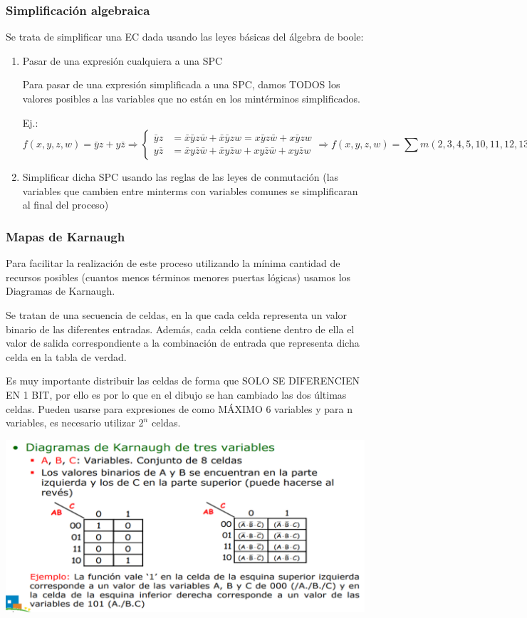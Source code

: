 \documentclass[a4paper,10pt]{book}
\begin{document}
\subsubsection*{Simplificación algebraica}
Se trata de simplificar una EC dada usando las leyes básicas del álgebra de boole:
\begin{enumerate}
\item Pasar de una expresión cualquiera a una SPC

Para pasar de una expresión simplificada a una SPC, damos TODOS los valores posibles a las variables que no están en los mintérminos simplificados.\par
Ej.:
$$f(x,y,z,w)=\bar{y}z+y\bar{z}\Rightarrow
\begin{cases}
\bar{y}z & =\bar{x}\bar{y}z\bar{w}+ \bar{x}\bar{y}zw=x\bar{y}z\bar{w}+x\bar{y}zw \\
y\bar{z} & =\bar{x}y\bar{z}\bar{w}+ \bar{x}y\bar{z}w + xy\bar{z}\bar{w}+ xy\bar{z}w
\end{cases}
\Rightarrow  f(x,y,z,w)=\sum m(2,3,4,5,10,11,12,13)
$$

\item Simplificar dicha SPC usando las reglas de las leyes de conmutación (las variables que cambien entre minterms con variables comunes se simplificaran al final del proceso)

\end{enumerate}

\subsubsection*{Mapas de Karnaugh}
Para facilitar la realización de este proceso utilizando la mínima cantidad de recursos posibles (cuantos menos términos menores puertas lógicas) usamos los Diagramas de Karnaugh.\par
Se tratan de una secuencia de celdas, en la que cada celda representa un valor binario de las diferentes entradas. Además, cada celda contiene dentro de ella el valor de salida correspondiente a la combinación de entrada que representa dicha celda en la tabla de verdad.\par
Es muy importante distribuir las celdas de forma que SOLO SE DIFERENCIEN EN 1 BIT, por ello es por lo que en el dibujo se han cambiado las dos últimas celdas. Pueden usarse para expresiones de como MÁXIMO 6 variables y para n variables, es necesario utilizar $2^n$ celdas.

\begin{center}
\includegraphics[scale=0.75]{mapas 1}
\end{center}
\end{document}
